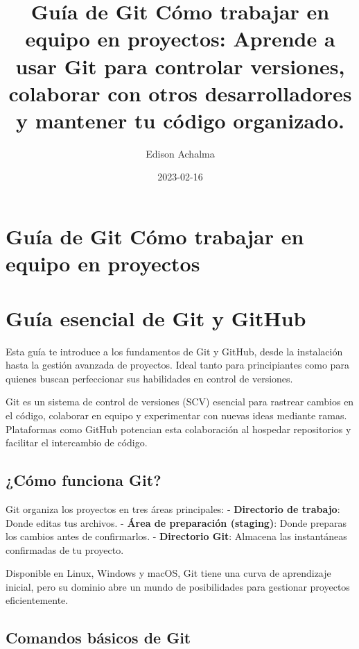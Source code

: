 \documentclass[
  doc,
  floatsintext,
  longtable,
  a4paper,
  nolmodern,
  notxfonts,
  notimes,
  colorlinks=true,linkcolor=blue,citecolor=blue,urlcolor=blue]{apa7}
\title{Guía de Git Cómo trabajar en equipo en proyectos: Aprende a usar
Git para controlar versiones, colaborar con otros desarrolladores y
mantener tu código organizado.}
\author{Edison Achalma}
\affiliation{
{Escuela Profesional de Economía, Universidad Nacional de San Cristóbal
de Huamanga}}
\date{2023-02-16}
\begin{document}
\maketitle

\hypertarget{toc}{}
\tableofcontents
\newpage
\section[Introduction]{Guía de Git Cómo trabajar en equipo en proyectos}

\setcounter{secnumdepth}{5}

\setlength\LTleft{0pt}


\section{Guía esencial de Git y
GitHub}\label{guuxeda-esencial-de-git-y-github}

Esta guía te introduce a los fundamentos de Git y GitHub, desde la
instalación hasta la gestión avanzada de proyectos. Ideal tanto para
principiantes como para quienes buscan perfeccionar sus habilidades en
control de versiones.

Git es un sistema de control de versiones (SCV) esencial para rastrear
cambios en el código, colaborar en equipo y experimentar con nuevas
ideas mediante ramas. Plataformas como GitHub potencian esta
colaboración al hospedar repositorios y facilitar el intercambio de
código.

\subsection{¿Cómo funciona Git?}\label{cuxf3mo-funciona-git}

Git organiza los proyectos en tres áreas principales: -
\textbf{Directorio de trabajo}: Donde editas tus archivos. -
\textbf{Área de preparación (staging)}: Donde preparas los cambios antes
de confirmarlos. - \textbf{Directorio Git}: Almacena las instantáneas
confirmadas de tu proyecto.

Disponible en Linux, Windows y macOS, Git tiene una curva de aprendizaje
inicial, pero su dominio abre un mundo de posibilidades para gestionar
proyectos eficientemente.

\subsection{Comandos básicos de Git}\label{comandos-buxe1sicos-de-git}
\end{document}
